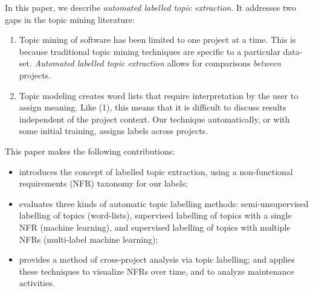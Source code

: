 \documentclass[smallextended]{svjour3}       %
\begin{document}
In this paper, we describe \emph{automated labelled topic extraction}. It addresses two gaps in the topic mining literature:
\begin{enumerate}
  \item Topic mining of software has been limited to one project at a time. 
This is because traditional topic mining techniques are specific to a particular data-set. 
\textit{Automated labelled topic extraction} allows for comparisons \textit{between} projects. 
  \item Topic modeling creates word lists that require interpretation by the user to assign meaning. 
Like (1), this means
that it is difficult to discuss results independent of the project context. 
Our technique automatically, or with some initial training, assigns labels across projects.
\end{enumerate}

This paper makes the following contributions: 
\begin{itemize}
\item introduces the concept of labelled topic extraction, using a non-functional requirements (NFR) taxonomy for our labels; 


\item evaluates three kinds of automatic topic labelling methods:
  semi-unsupervised labelling  of topics (word-lists), supervised labelling of
  topics with a single NFR (machine learning), 
  and supervised labelling of topics with multiple NFRs (multi-label
  machine learning);



\item provides a method of cross-project analysis via topic labelling; and
 applies these techniques to visualize NFRs over time, and to analyze maintenance activities.
\end{itemize}
\end{document}
